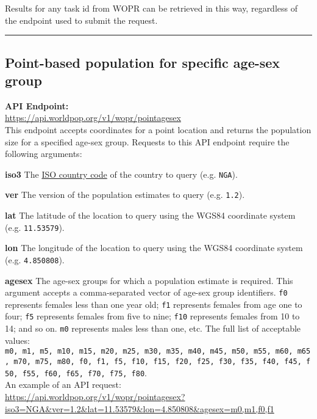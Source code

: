 \documentclass[]{article}
\begin{document}
Results for any task id from WOPR can be retrieved in this way,
regardless of the endpoint used to submit the request.\\

\begin{center}\rule{0.5\linewidth}{0.5pt}\end{center}

\subsection{Point-based population for specific age-sex
group}\label{point-based-population-for-specific-age-sex-group}

\textbf{API Endpoint:}\\
\url{https://api.worldpop.org/v1/wopr/pointagesex}\\

This endpoint accepts coordinates for a point location and returns the
population size for a specified age-sex group. Requests to this API
endpoint require the following arguments:

\textbf{iso3} The
\href{https://en.wikipedia.org/wiki/ISO_3166-1_alpha-3}{ISO country
code} of the country to query (e.g. \texttt{NGA}).

\textbf{ver} The version of the population estimates to query (e.g.
\texttt{1.2}).

\textbf{lat} The latitude of the location to query using the WGS84
coordinate system (e.g. \texttt{11.53579}).

\textbf{lon} The longitude of the location to query using the WGS84
coordinate system (e.g. \texttt{4.850808}).

\textbf{agesex} The age-sex groups for which a population estimate is
required. This argument accepts a comma-separated vector of age-sex
group identifiers. \texttt{f0} represents females less than one year
old; \texttt{f1} represents females from age one to four; \texttt{f5}
represents females from five to nine; \texttt{f10} represents females
from 10 to 14; and so on. \texttt{m0} represents males less than one,
etc. The full list of acceptable values:
\texttt{m0,\ m1,\ m5,\ m10,\ m15,\ m20,\ m25,\ m30,\ m35,\ m40,\ m45,\ m50,\ m55,\ m60,\ m65,\ m70,\ m75,\ m80,\ f0,\ f1,\ f5,\ f10,\ f15,\ f20,\ f25,\ f30,\ f35,\ f40,\ f45,\ f50,\ f55,\ f60,\ f65,\ f70,\ f75,\ f80}.\\

An example of an API request:\\
\url{https://api.worldpop.org/v1/wopr/pointagesex?iso3=NGA\&ver=1.2\&lat=11.53579\&lon=4.850808\&agesex=m0,m1,f0,f1}\\
\end{document}
